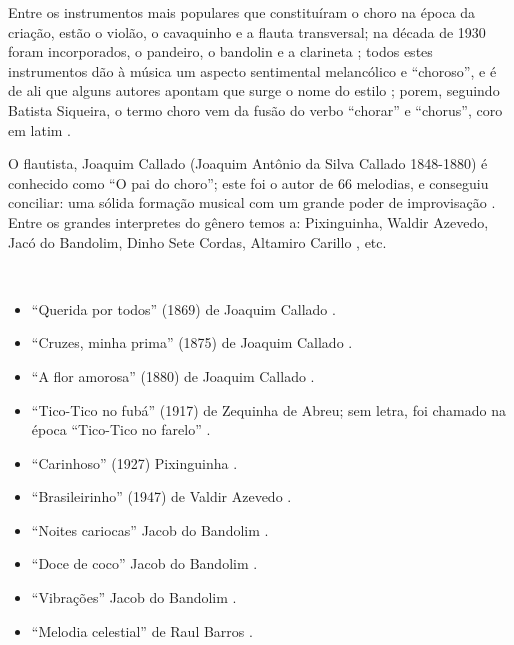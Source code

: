 Entre os instrumentos mais populares que constituíram o choro na época da criação, 
estão o violão, o cavaquinho e a flauta transversal;
na década de 1930 foram incorporados, o pandeiro, o bandolin e a clarineta \cite[pp. 64]{reinato2010musica} \cite[pp. 79]{dourado2004dicionario} \cite[pp. 132]{perna2002samba};
todos estes instrumentos dão à música um aspecto sentimental melancólico e ``choroso'', e
é de ali que alguns autores apontam que surge o nome do estilo \cite[pp. 132]{perna2002samba};
porem, seguindo Batista Siqueira, 
o termo choro vem da fusão do verbo ``chorar'' e ``chorus'', coro em latim \cite[pp. 13]{diniz2003almanaque}.

O flautista, Joaquim Callado (Joaquim Antônio da Silva Callado 1848-1880) 
é conhecido como ``O pai do choro'';
este foi o autor de 66 melodias, e conseguiu conciliar: 
uma sólida formação musical com um grande poder de improvisação  \cite[pp. 15]{diniz2003almanaque} \cite[pp. 64]{reinato2010musica}.
Entre os grandes interpretes do gênero temos a:
Pixinguinha, Waldir Azevedo, Jacó do Bandolim, Dinho Sete Cordas, Altamiro Carillo \cite[pp. 79]{dourado2004dicionario}, etc.

\begin{example} ~

\begin{itemize}
\item ``Querida por todos'' (1869) de Joaquim Callado \cite[pp. 15]{diniz2003almanaque} \cite[pp. 1089]{marcondes1977enciclopediav2}.
\item ``Cruzes, minha prima'' (1875) de Joaquim Callado \cite[pp. 15]{diniz2003almanaque} \cite[pp. 951]{marcondes1977enciclopediav2}.
\item ``A flor amorosa'' (1880) de Joaquim Callado \cite[pp. 8]{livingston2005choro} \cite[pp. 15]{diniz2003almanaque}  \cite[pp. 985]{marcondes1977enciclopediav2}.
\item ``Tico-Tico no fubá'' (1917) de Zequinha de Abreu; sem letra, foi chamado na época ``Tico-Tico no farelo'' \cite[pp. 6]{marcondes1998enciclopedia} \cite[pp. 39,91]{diniz2003almanaque}.
\item ``Carinhoso'' (1927) Pixinguinha   \cite[pp. 133]{perna2002samba}.
\item ``Brasileirinho'' (1947) de Valdir Azevedo  \cite[pp. 133]{perna2002samba}.
\item ``Noites cariocas'' Jacob do Bandolim \cite{diniz2003almanaque}.
\item ``Doce de coco'' Jacob do Bandolim \cite{diniz2003almanaque}.
\item ``Vibrações'' Jacob do Bandolim \cite{diniz2003almanaque}.
\item ``Melodia celestial'' de Raul Barros \cite[pp. 130]{livingston2005choro}.
\end{itemize}
\end{example}

